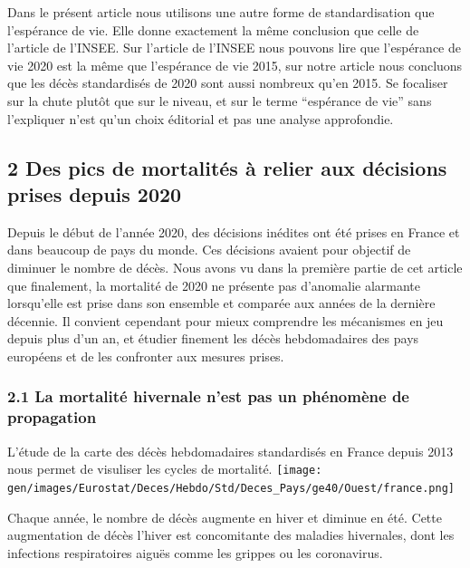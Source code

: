 \documentclass[
]{article}
\begin{document}
Dans le présent article nous utilisons une autre forme de
standardisation que l'espérance de vie. Elle donne exactement la même
conclusion que celle de l'article de l'INSEE. Sur l'article de l'INSEE
nous pouvons lire que l'espérance de vie 2020 est la même que
l'espérance de vie 2015, sur notre article nous concluons que les décès
standardisés de 2020 sont aussi nombreux qu'en 2015. Se focaliser sur la
chute plutôt que sur le niveau, et sur le terme ``espérance de vie''
sans l'expliquer n'est qu'un choix éditorial et pas une analyse
approfondie.

\hypertarget{des-pics-de-mortalituxe9s-uxe0-relier-aux-duxe9cisions-prises-depuis-2020}{%
\subsection{2 Des pics de mortalités à relier aux décisions prises
depuis
2020}\label{des-pics-de-mortalituxe9s-uxe0-relier-aux-duxe9cisions-prises-depuis-2020}}

Depuis le début de l'année 2020, des décisions inédites ont été prises
en France et dans beaucoup de pays du monde. Ces décisions avaient pour
objectif de diminuer le nombre de décès. Nous avons vu dans la première
partie de cet article que finalement, la mortalité de 2020 ne présente
pas d'anomalie alarmante lorsqu'elle est prise dans son ensemble et
comparée aux années de la dernière décennie. Il convient cependant pour
mieux comprendre les mécanismes en jeu depuis plus d'un an, et étudier
finement les décès hebdomadaires des pays européens et de les confronter
aux mesures prises.

\hypertarget{la-mortalituxe9-hivernale-nest-pas-un-phuxe9nomuxe8ne-de-propagation}{%
\subsubsection{2.1 La mortalité hivernale n'est pas un phénomène de
propagation}\label{la-mortalituxe9-hivernale-nest-pas-un-phuxe9nomuxe8ne-de-propagation}}

L'étude de la carte des décès hebdomadaires standardisés en France
depuis 2013 nous permet de visuliser les cycles de mortalité.
\texttt{[image: gen/images/Eurostat/Deces/Hebdo/Std/Deces\_Pays/ge40/Ouest/france.png]}

Chaque année, le nombre de décès augmente en hiver et diminue en été.
Cette augmentation de décès l'hiver est concomitante des maladies
hivernales, dont les infections respiratoires aiguës comme les grippes
ou les coronavirus.
\end{document}
